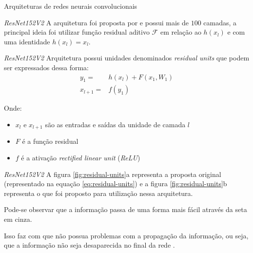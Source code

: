 \begin{frame}[plain]
    \begin{center}
        \LARGE Arquiteturas de redes neurais convolucionais    
    \end{center}
\end{frame}

\begin{frame}{\textit{ResNet152V2}}\label{sec:ResNet152V2}
    A arquitetura foi proposta por \textcite{he2016identitymappingsdeepresidual} e possui mais de $100$ camadas, a principal ideia foi utilizar função residual aditivo $\mathcal{F}$ em relação ao $h(x_{l})$ e com uma identidade $h(x_{l})=x_{l}$.
\end{frame}

\begin{frame}{\textit{ResNet152V2}}
    Arquitetura possui unidades denominados \textit{residual units} que podem ser expressados dessa forma:
\begin{align}\label{eq:residual-units}
    y_1=&h(x_l)+F(x_1,W_1)\\
    x_{l+1}=&f(y_1)
\end{align}

    Onde:
    \begin{itemize}
        \item $x_l$ e $x_{l+1}$ são as entradas e saídas da unidade de camada $l$
        \item $F$ é a função residual 
        \item $f$ é a ativação \textit{rectified linear unit} (\textit{ReLU})
    \end{itemize}
\end{frame}

\begin{frame}{\textit{ResNet152V2}}
    A figura \ref{fig:residual-units}a representa a proposta original (representado na equação \ref{eq:residual-units}) e a figura \ref{fig:residual-units}b representa o que foi proposto para utilização nessa arquitetura. 
    \vspace{1em}
    
    Pode-se observar que a informação passa de uma forma mais fácil através da seta em cinza.

    \vspace{1em}
    Isso faz com que não possua problemas com a propagação da informação, ou seja, que a informação não seja desaparecida no final da rede \cite{he2016identitymappingsdeepresidual}.
\end{frame}

